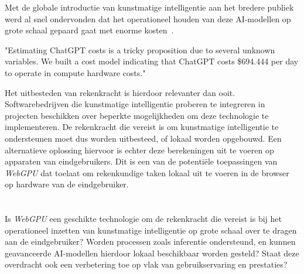 Met de globale introductie van kunstmatige intelligentie aan het bredere publiek werd al snel ondervonden dat het operationeel houden van deze AI-modellen op grote schaal gepaard gaat met enorme kosten~\autocite{Patel2023}.

\begin{displayquote}
    "Estimating ChatGPT costs is a tricky proposition due to several unknown variables. We built a cost model indicating that ChatGPT costs \$694.444 per day to operate in compute hardware costs."
\end{displayquote}

Het uitbesteden van rekenkracht is hierdoor relevanter dan ooit. Softwarebedrijven die kunstmatige intelligentie proberen te integreren in projecten beschikken over beperkte mogelijkheden om deze technologie te implementeren. De rekenkracht die vereist is om kunstmatige intelligentie te ondersteunen moet dus worden uitbesteed, of lokaal worden opgebouwd. Een alternatieve oplossing hiervoor is echter deze berekeningen uit te voeren op apparaten van eindgebruikers. Dit is een van de potentiële toepassingen van \textit{WebGPU} dat toelaat om rekenkundige taken lokaal uit te voeren in de browser op hardware van de eindgebruiker.

\break{}

\section{}%
\label{sec:onderzoeksvraag}


Is \textit{WebGPU} een geschikte technologie om de rekenkracht die vereist is bij het operationeel inzetten van kunstmatige intelligentie op grote schaal over te dragen aan de eindgebruiker? Worden processen zoals inferentie ondersteund, en kunnen geavanceerde AI-modellen hierdoor lokaal beschikbaar worden gesteld? Staat deze overdracht ook een verbetering toe op vlak van gebruikservaring en prestaties?

\section{}%
\label{sec:onderzoeksdoelstelling}

